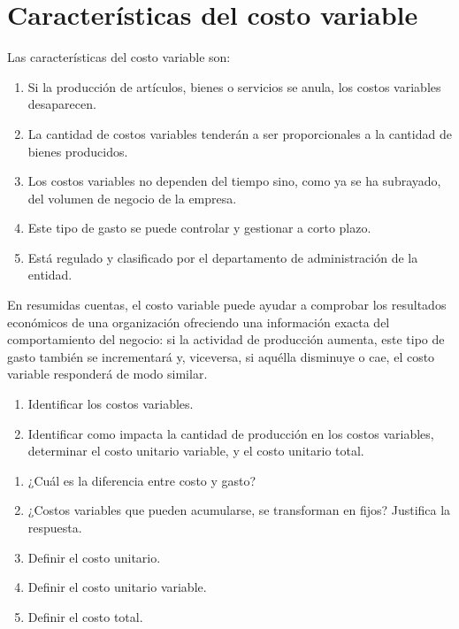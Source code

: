 \documentclass[../main.tex]{subfiles}
\begin{document}
\section{Características del costo variable}
\begin{center}
\end{center}
Las características del costo variable son:
\begin{enumerate}
  \item Si la producción de artículos, bienes o servicios se anula,
    los costos variables desaparecen.
  \item La cantidad de costos variables tenderán a ser proporcionales
    a la cantidad de bienes producidos.
  \item Los costos variables no dependen del tiempo sino, como ya se
    ha subrayado, del volumen de negocio de la empresa.
  \item Este tipo de gasto se puede controlar y gestionar a corto plazo.
  \item Está regulado y clasificado por el departamento de
    administración de la entidad.
\end{enumerate}
En resumidas cuentas, el costo variable puede ayudar a comprobar los
resultados económicos de una organización ofreciendo una información
exacta del comportamiento del negocio: si la actividad de producción
aumenta, este tipo de gasto también se incrementará y, viceversa, si
aquélla disminuye o cae, el costo variable responderá de modo similar.
\begin{enumerate}
  \item Identificar los costos variables.
  \item Identificar como impacta la cantidad de producción en los
    costos variables, determinar el costo unitario variable, y el
    costo unitario total.
\end{enumerate}
\begin{enumerate}
  \item ¿Cuál es la diferencia entre costo y gasto?
  \item ¿Costos variables que pueden acumularse, se transforman en
    fijos? Justifica la respuesta.
  \item Definir el costo unitario.
  \item Definir el costo unitario variable.
  \item Definir el costo total.
\end{enumerate}
\end{document}
